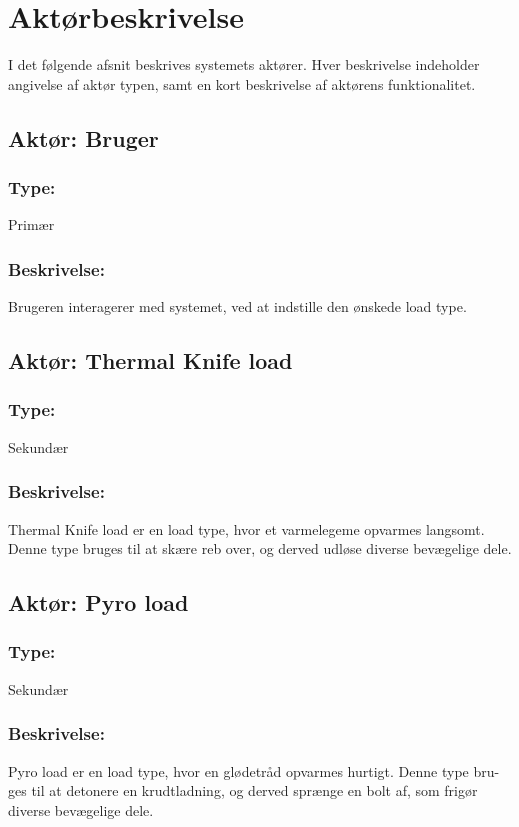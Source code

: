 \section{Aktørbeskrivelse}
I det følgende afsnit beskrives systemets aktører. Hver beskrivelse indeholder angivelse af aktør typen, samt en kort beskrivelse af aktørens funktionalitet.

\begin{framed}
	\subsection{Aktør: Bruger}
	\subsubsection*{Type:}
		Primær
	
	\subsubsection*{Beskrivelse:}
		Brugeren interagerer med systemet, ved at indstille den ønskede load type.
\end{framed}

\begin{framed}
	\subsection{Aktør: Thermal Knife load}
	\subsubsection*{Type:}
	Sekundær
	
	\subsubsection*{Beskrivelse:}
	Thermal Knife load er en load type, hvor et varmelegeme opvarmes langsomt. \indent Denne type bruges til at skære reb over, og derved udløse diverse bevægelige \indent dele.
\end{framed}

\begin{framed}
	\subsection{Aktør: Pyro load}
	\subsubsection*{Type:}
	Sekundær
	
	\subsubsection*{Beskrivelse:}
	Pyro load er en load type, hvor en glødetråd opvarmes hurtigt. Denne type bru- \indent ges til at detonere en krudtladning, og derved sprænge en bolt af, som frigør \indent diverse bevægelige dele.
\end{framed}

